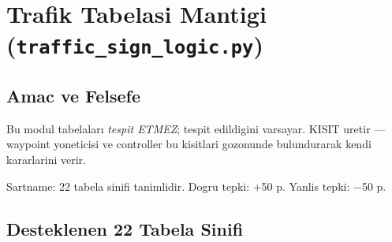 \documentclass[a4paper,12pt]{article}
\begin{document}
\section{Trafik Tabelasi Mantigi (\texttt{traffic\_sign\_logic.py})}

\subsection{Amac ve Felsefe}

Bu modul tabelalar\i{} \emph{tespit ETMEZ}; tespit edildigini varsayar.
KISIT uretir --- waypoint yoneticisi ve controller bu kisitlari
gozonunde bulundurarak kendi kararlarini verir.

\begin{specbox}
Sartname: 22 tabela sinifi tanimlidir.
Dogru tepki: +50 p. Yanlis tepki: $-$50 p.
\end{specbox}

\subsection{Desteklenen 22 Tabela Sinifi}
\end{document}
